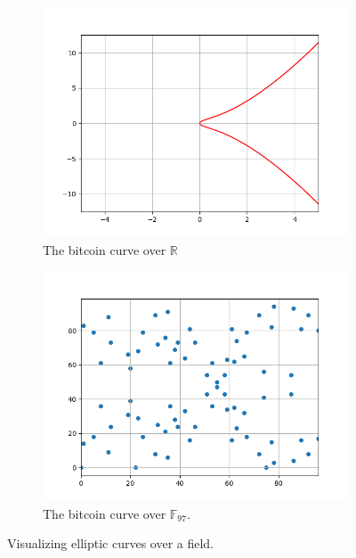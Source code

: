 \documentclass{article}
\begin{document}
    \begin{figure}[htbp]
        \centering
        
        \begin{subfigure}[t]{.45\textwidth}
            \centering
            \includegraphics[scale = 0.4]{images/curve.png}
            \caption{The bitcoin curve over $\mathbb{R}$}
            \label{fig:point_addition}
        \end{subfigure}
        \begin{subfigure}[t]{.45\textwidth}
            \centering
            \includegraphics[scale = 0.4]{images/curve_over_field.png}
            \caption{The bitcoin curve over $\mathbb{F}_{97}$.}
            \label{fig:point_multiplication}
        \end{subfigure}
        \caption{Visualizing elliptic curves over a field.}
        \label{fig:edge_case}
    \end{figure}
\end{document}

